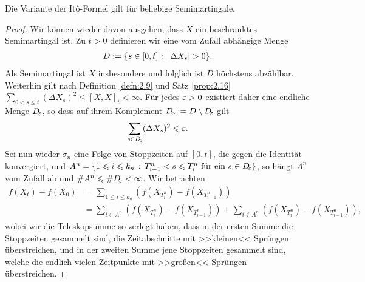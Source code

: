 \begin{prop*}[Proposition B]
Die Variante der Itô-Formel gilt für beliebige Semimartingale.\fish
\end{prop*}

\begin{proof}
Wir können wieder davon ausgehen, dass $X$ ein beschränktes Semimartingal ist.
Zu $t > 0$ definieren wir eine vom Zufall abhängige Menge
\begin{align*}
D\defl \setdef{s\in [0,t]}{\abs{\Delta X_s} > 0}.
\end{align*}
Als Semimartingal ist $X$ insbesondere \cadlag und folglich ist $D$ höchstens
abzählbar. Weiterhin gilt nach Definition \ref{defn:2.9} und Satz
\ref{prop:2.16} $\sum_{0< s\le t} (\Delta X_s)^2 \le [X,X]_t < \infty$.
Für jedes $\varepsilon > 0$ existiert daher eine endliche Menge $D_{\!\varepsilon}$, so
dass auf ihrem Komplement $D_{\!\mathrm{o}} := D\setminus D_{\!\varepsilon}$ gilt
\begin{align*}
\sum_{s\in D_{\!\mathrm{o}}} (\Delta X_s)^2 \leqslant \varepsilon.
\end{align*}
Sei nun wieder $\sigma_n$ eine Folge von Stoppzeiten auf $[0,t]$, die gegen die
Identität konvergiert, und $A^n = \setdef{1\le i\le k_n}{T_{i-1}^n< s\le T_i^n
\text{ für ein } s\in D_{\!\ep}}$, so hängt $A^n$ vom Zufall ab und $\# A^n \leqslant \#
D_{\!\varepsilon} < \infty$. Wir betrachten
\begin{align*}
f(X_t)-f(X_0) &= \sum_{1\le i\le k_n} \left(f(X_{T_{i}^n})-f(X_{T_{i-1}^n})
\right) \\ 
&= 
\sum_{i\in A^n}
\left(f(X_{T_{i}^n})-f(X_{T_{i-1}^n}) \right)
+
\sum_{i\notin A^n} \left(f(X_{T_{i}^n})-f(X_{T_{i-1}^n})
\right),
\end{align*}
wobei wir die Teleskopsumme so zerlegt haben, dass in der ersten Summe die
Stoppzeiten gesammelt sind, die Zeitabschnitte mit >>kleinen<< Sprüngen
überstreichen, und in der zweiten Summe jene Stoppzeiten gesammelt sind, welche
die endlich vielen Zeitpunkte mit >>großen<< Sprüngen überstreichen.


\end{proof}
